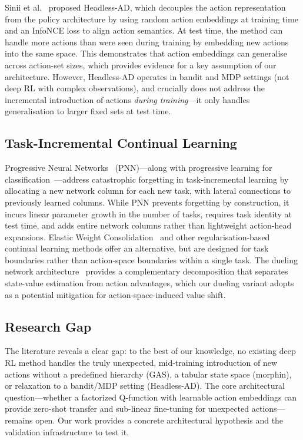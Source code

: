 \documentclass{article}
\begin{document}
Sinii et al.~\cite{sinii2023headless} proposed Headless-AD, which decouples the action representation from the policy architecture by using random action embeddings at training time and an InfoNCE loss to align action semantics. At test time, the method can handle more actions than were seen during training by embedding new actions into the same space. This demonstrates that action embeddings can generalise across action-set sizes, which provides evidence for a key assumption of our architecture. However, Headless-AD operates in bandit and MDP settings (not deep RL with complex observations), and crucially does not address the incremental introduction of actions \emph{during training}---it only handles generalisation to larger fixed sets at test time.

\subsection{Task-Incremental Continual Learning}

Progressive Neural Networks~\cite{rusu2016progressive} (PNN)---along with progressive learning for classification~\cite{venkatesan2016progressive}---address catastrophic forgetting in task-incremental learning by allocating a new network column for each new task, with lateral connections to previously learned columns. While PNN prevents forgetting by construction, it incurs linear parameter growth in the number of tasks, requires task identity at test time, and adds entire network columns rather than lightweight action-head expansions. Elastic Weight Consolidation~\cite{kirkpatrick2017overcoming} and other regularisation-based continual learning methods offer an alternative, but are designed for task boundaries rather than action-space boundaries within a single task. The dueling network architecture~\cite{wang2016dueling} provides a complementary decomposition that separates state-value estimation from action advantages, which our dueling variant adopts as a potential mitigation for action-space-induced value shift.

\subsection{Research Gap}

The literature reveals a clear gap: to the best of our knowledge, no existing deep RL method handles the truly unexpected, mid-training introduction of new actions without a predefined hierarchy (GAS), a tabular state space (morphin), or relaxation to a bandit/MDP setting (Headless-AD). The core architectural question---whether a factorized Q-function with learnable action embeddings can provide zero-shot transfer and sub-linear fine-tuning for unexpected actions---remains open. Our work provides a concrete architectural hypothesis and the validation infrastructure to test it.
\end{document}
